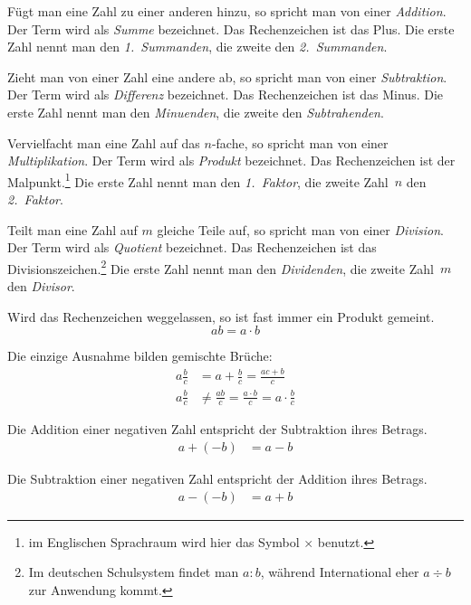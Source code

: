 \begin{defi}[Addition]
 Fügt man eine Zahl zu einer anderen hinzu, so spricht man von einer \emph{Addition}. Der Term wird als \emph{Summe} bezeichnet. Das Rechenzeichen ist das Plus. Die erste Zahl nennt man den \emph{1.~Summanden}, die zweite den \emph{2.~Summanden}.
\end{defi}
\begin{defi}[Subtraktion]
 Zieht man von einer Zahl eine andere ab, so spricht man von einer \emph{Subtraktion}. Der Term wird als \emph{Differenz} bezeichnet. Das Rechenzeichen ist das Minus. Die erste Zahl nennt man den \emph{Minuenden}, die zweite den \emph{Subtrahenden}.
\end{defi}
\begin{defi}[Multiplikation]
 Vervielfacht man eine Zahl auf das \(n\)-fache, so spricht man von einer \emph{Multiplikation}. Der Term wird als \emph{Produkt} bezeichnet. Das Rechenzeichen ist der Malpunkt.\footnote{im Englischen Sprachraum wird hier das Symbol \(\times\) benutzt.} Die erste Zahl nennt man den \emph{1.~Faktor}, die zweite Zahl~\(n\) den \emph{2.~Faktor}.
\end{defi}
\begin{defi}[Division]
 Teilt man eine Zahl auf \(m\) gleiche Teile auf, so spricht man von einer \emph{Division}. Der Term wird als \emph{Quotient} bezeichnet. Das Rechenzeichen ist das Divisionszeichen.\footnote{Im deutschen Schulsystem findet man \(a:b\), während International eher \(a\div b\) zur Anwendung kommt.} Die erste Zahl nennt man den \emph{Dividenden}, die zweite Zahl~\(m\) den \emph{Divisor}.
\end{defi}

\begin{regel}
Wird das Rechenzeichen weggelassen, so ist fast immer ein Produkt gemeint.
\[ab = a\cdot b\]

Die einzige Ausnahme bilden gemischte Brüche:
\begin{align*}a\frac{b}{c} &= a+\frac{b}{c} = \frac{ac+b}{c}\\
   a\frac{b}{c} &\ne \frac{ab}{c} = \frac{a\cdot b}{c} = a\cdot \frac{b}{c}
\end{align*}
\end{regel}

\begin{regel}
Die Addition einer negativen Zahl entspricht der Subtraktion ihres Betrags.
\begin{align*}
 a+(-b) &= a-b
\end{align*}

Die Subtraktion einer negativen Zahl entspricht der Addition ihres Betrags.
\begin{align*}
 a-(-b) &= a+b
\end{align*}
\end{regel}

